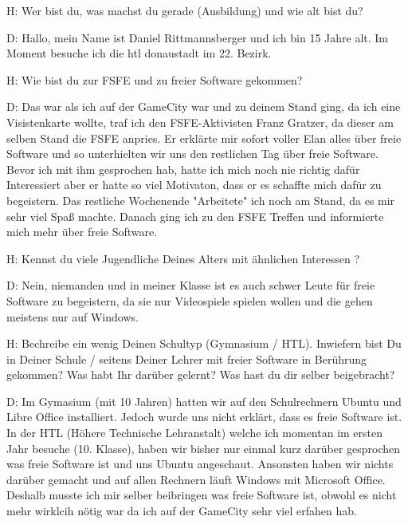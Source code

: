 
H: Wer bist du, was machst du gerade (Ausbildung) und wie alt bist du?


D: Hallo, mein Name ist Daniel Rittmannsberger und ich bin 15 Jahre alt. Im Moment besuche ich die htl donaustadt im 22. Bezirk.





H: Wie bist du zur FSFE und zu freier Software gekommen?


D: Das war als ich auf der GameCity war und zu deinem Stand ging, da ich eine Visistenkarte wollte, traf ich den FSFE-Aktivisten
   Franz Gratzer, da dieser am selben Stand die FSFE anpries. Er erklärte mir sofort voller Elan alles über freie Software und so
   unterhielten wir uns den restlichen Tag über freie Software. Bevor ich mit ihm gesprochen hab, hatte ich mich noch nie
   richtig dafür Interessiert aber er hatte so viel Motivaton, dass er es schaffte mich dafür zu begeistern. Das restliche
   Wochenende "Arbeitete" ich noch am Stand, da es mir sehr viel Spaß machte. Danach ging ich zu den FSFE Treffen und
   informierte mich mehr über freie Software.





H: Kennst du viele Jugendliche Deines Alters mit ähnlichen Interessen ?


D: Nein, niemanden und in meiner Klasse ist es auch schwer Leute für freie Software zu begeistern, da sie nur Videospiele
   spielen wollen und die gehen meistens nur auf Windows.





H: Bechreibe ein wenig Deinen Schultyp (Gymnasium / HTL). Inwiefern bist Du in Deiner Schule / seitens Deiner Lehrer 
   mit freier Software in Berührung gekommen? Was habt Ihr darüber gelernt? Was hast du dir selber beigebracht?


D: Im Gymasium (mit 10 Jahren) hatten wir auf den Schulrechnern Ubuntu und Libre Office installiert. Jedoch wurde uns nicht
   erklärt, dass es freie Software ist.
   In der HTL (Höhere Technische Lehranstalt) welche ich momentan im ersten Jahr besuche (10. Klasse), haben wir bisher nur
   einmal kurz darüber gesprochen was freie Software ist und uns Ubuntu angeschaut. Ansonsten haben wir nichts darüber gemacht und auf
   allen Rechnern läuft Windows mit Microsoft Office. Deshalb musste ich mir selber beibringen was freie Software ist, obwohl es nicht
   mehr wirklcih nötig war da ich auf der GameCity sehr viel erfahen hab.





